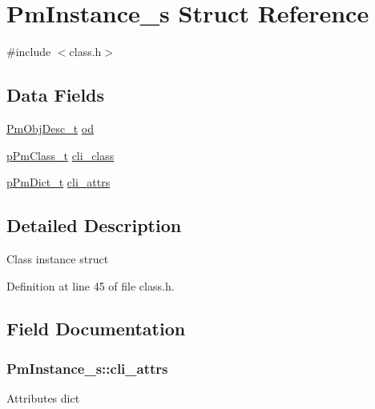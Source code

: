 \hypertarget{struct_pm_instance__s}{\section{Pm\-Instance\-\_\-s Struct Reference}
\label{struct_pm_instance__s}
}


{\ttfamily \#include $<$class.\-h$>$}

\subsection*{Data Fields}
\begin{DoxyCompactItemize}
\item 
\hyperlink{obj_8h_a72d816790acd8eb550fb25268c2b3489}{Pm\-Obj\-Desc\-\_\-t} \hyperlink{struct_pm_instance__s_a8fc0e18aad0c3417991345f33bc3f150}{od}
\item 
\hyperlink{class_8h_a4c7a4a1c8cf182d0ff0002dacea0aacc}{p\-Pm\-Class\-\_\-t} \hyperlink{struct_pm_instance__s_a0fe0e7fa65978e3f0f7268e5bf7ceb07}{cli\-\_\-class}
\item 
\hyperlink{dict_8h_a32b81dc9e05f3a84863319301daf749b}{p\-Pm\-Dict\-\_\-t} \hyperlink{struct_pm_instance__s_a302e4a1cd1e390511bc7c19200ff3e23}{cli\-\_\-attrs}
\end{DoxyCompactItemize}


\subsection{Detailed Description}
Class instance struct 

Definition at line 45 of file class.\-h.



\subsection{Field Documentation}
\hypertarget{struct_pm_instance__s_a302e4a1cd1e390511bc7c19200ff3e23}{
\subsubsection[{cli\-\_\-attrs}]{ Pm\-Instance\-\_\-s\-::cli\-\_\-attrs}}\label{struct_pm_instance__s_a302e4a1cd1e390511bc7c19200ff3e23}
Attributes dict 

